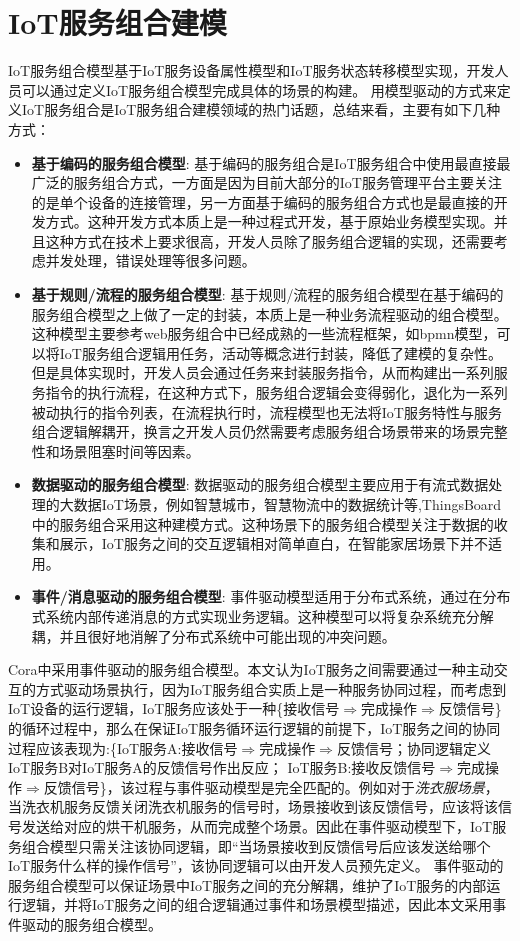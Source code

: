 \documentclass[winfonts,master,twoside]{njuthesis}
\begin{document}
\section{IoT服务组合建模}
IoT服务组合模型基于IoT服务设备属性模型和IoT服务状态转移模型实现，开发人员可以通过定义IoT服务组合模型完成具体的场景的构建。
用模型驱动的方式来定义IoT服务组合是IoT服务组合建模领域的热门话题，总结来看，主要有如下几种方式：
\begin{itemize}
    \item  \textbf{基于编码的服务组合模型}:
    基于编码的服务组合是IoT服务组合中使用最直接最广泛的服务组合方式，一方面是因为目前大部分的IoT服务管理平台主要关注的是单个设备的连接管理，另一方面基于编码的服务组合方式也是最直接的开发方式。这种开发方式本质上是一种过程式开发，基于原始业务模型实现。并且这种方式在技术上要求很高，开发人员除了服务组合逻辑的实现，还需要考虑并发处理，错误处理等很多问题。
    \item  \textbf{基于规则/流程的服务组合模型}:
    基于规则/流程的服务组合模型在基于编码的服务组合模型之上做了一定的封装，本质上是一种业务流程驱动的组合模型。这种模型主要参考web服务组合中已经成熟的一些流程框架，如bpmn模型\cite{bpmn}，可以将IoT服务组合逻辑用任务，活动等概念进行封装，降低了建模的复杂性。但是具体实现时，开发人员会通过任务来封装服务指令，从而构建出一系列服务指令的执行流程，在这种方式下，服务组合逻辑会变得弱化，退化为一系列被动执行的指令列表，在流程执行时，流程模型也无法将IoT服务特性与服务组合逻辑解耦开，换言之开发人员仍然需要考虑服务组合场景带来的场景完整性和场景阻塞时间等因素。
    \item  \textbf{数据驱动的服务组合模型}:
    数据驱动的服务组合模型主要应用于有流式数据处理的大数据IoT场景，例如智慧城市，智慧物流中的数据统计等,ThingsBoard中的服务组合采用这种建模方式。这种场景下的服务组合模型关注于数据的收集和展示，IoT服务之间的交互逻辑相对简单直白，在智能家居场景下并不适用。
    \item  \textbf{事件/消息驱动的服务组合模型}:
    事件驱动模型\cite{levina2009realizing}适用于分布式系统，通过在分布式系统内部传递消息的方式实现业务逻辑。这种模型可以将复杂系统充分解耦，并且很好地消解了分布式系统中可能出现的冲突问题\cite{scheer2005process}。
\end{itemize}

Cora中采用事件驱动的服务组合模型。本文认为IoT服务之间需要通过一种主动交互的方式驱动场景执行，因为IoT服务组合实质上是一种服务协同过程，而考虑到IoT设备的运行逻辑，IoT服务应该处于一种\{接收信号$\Rightarrow$完成操作$\Rightarrow$反馈信号\}的循环过程中，那么在保证IoT服务循环运行逻辑的前提下，IoT服务之间的协同过程应该表现为:\{IoT服务A:接收信号$\Rightarrow$完成操作$\Rightarrow$反馈信号；协同逻辑定义IoT服务B对IoT服务A的反馈信号作出反应； IoT服务B:接收反馈信号$\Rightarrow$完成操作$\Rightarrow$反馈信号\}，该过程与事件驱动模型是完全匹配的。例如对于\textit{洗衣服场景}，当洗衣机服务反馈关闭洗衣机服务的信号时，场景接收到该反馈信号，应该将该信号发送给对应的烘干机服务，从而完成整个场景。因此在事件驱动模型下，IoT服务组合模型只需关注该协同逻辑，即“当场景接收到反馈信号后应该发送给哪个IoT服务什么样的操作信号”，该协同逻辑可以由开发人员预先定义。
事件驱动的服务组合模型可以保证场景中IoT服务之间的充分解耦，维护了IoT服务的内部运行逻辑，并将IoT服务之间的组合逻辑通过事件和场景模型描述，因此本文采用事件驱动的服务组合模型。
\end{document}
